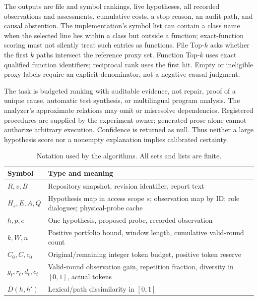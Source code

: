 \documentclass[letterpaper,journal]{IEEEtran}
\begin{document}
The outputs are file and symbol rankings, live hypotheses, all recorded observations and assessments, cumulative costs, a stop reason, an audit path, and causal abstention. The implementation's symbol list can contain a class name when the selected line lies within a class but outside a function; exact-function scoring must not silently treat such entries as functions. File Top-$k$ asks whether the first $k$ paths intersect the reference proxy set. Function Top-$k$ uses exact qualified function identifiers; reciprocal rank uses the first hit. Empty or ineligible proxy labels require an explicit denominator, not a negative causal judgment.

The task is budgeted ranking with auditable evidence, not repair, proof of a unique cause, automatic test synthesis, or multilingual program analysis. The analyzer's approximate relations may omit or misresolve dependencies. Registered procedures are supplied by the experiment owner; generated prose alone cannot authorize arbitrary execution. Confidence is returned as null. Thus neither a large hypothesis score nor a nonempty explanation implies calibrated certainty.

\begin{table}[t]
\caption{Notation used by the algorithms. All sets and lists are finite.}\label{tab:notation}
\centering\small
\begin{tabular}{@{}p{}p{}@{}}\toprule
Symbol & Type and meaning\\\midrule
$R,v,B$ & Repository snapshot, revision identifier, report text\\
$H_s,E,A,Q$ & Hypothesis map in access scope $s$; observation map by ID; role dialogues; physical-probe cache\\
$h,p,e$ & One hypothesis, proposed probe, recorded observation\\
$k,W,n$ & Positive portfolio bound, window length, cumulative valid-round count\\
$C_0,C,c_0$ & Original/remaining integer token budget, positive token reserve\\
$g_t,r_t,d_t,c_t$ & Valid-round observation gain, repetition fraction, diversity in $[0,1]$, actual tokens\\
$D(h,h')$ & Lexical/path dissimilarity in $[0,1]$\\
\bottomrule\end{tabular}
\end{table}
\end{document}
